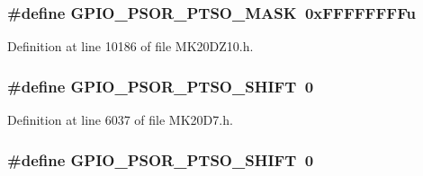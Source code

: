 \subsubsection[{\texorpdfstring{G\+P\+I\+O\+\_\+\+P\+S\+O\+R\+\_\+\+P\+T\+S\+O\+\_\+\+M\+A\+SK}{GPIO_PSOR_PTSO_MASK}}]{\setlength{\rightskip}{0pt plus 5cm}\#define G\+P\+I\+O\+\_\+\+P\+S\+O\+R\+\_\+\+P\+T\+S\+O\+\_\+\+M\+A\+SK~0x\+F\+F\+F\+F\+F\+F\+F\+Fu}\hypertarget{group___g_p_i_o___register___masks_gaa8a48e38ef70ff1ba3bbcbf31b891da4}{}\label{group___g_p_i_o___register___masks_gaa8a48e38ef70ff1ba3bbcbf31b891da4}


Definition at line 10186 of file M\+K20\+D\+Z10.\+h.

\subsubsection[{\texorpdfstring{G\+P\+I\+O\+\_\+\+P\+S\+O\+R\+\_\+\+P\+T\+S\+O\+\_\+\+S\+H\+I\+FT}{GPIO_PSOR_PTSO_SHIFT}}]{\setlength{\rightskip}{0pt plus 5cm}\#define G\+P\+I\+O\+\_\+\+P\+S\+O\+R\+\_\+\+P\+T\+S\+O\+\_\+\+S\+H\+I\+FT~0}\hypertarget{group___g_p_i_o___register___masks_ga5a962b85e07477e26afe639c7ca478cb}{}\label{group___g_p_i_o___register___masks_ga5a962b85e07477e26afe639c7ca478cb}


Definition at line 6037 of file M\+K20\+D7.\+h.

\subsubsection[{\texorpdfstring{G\+P\+I\+O\+\_\+\+P\+S\+O\+R\+\_\+\+P\+T\+S\+O\+\_\+\+S\+H\+I\+FT}{GPIO_PSOR_PTSO_SHIFT}}]{\setlength{\rightskip}{0pt plus 5cm}\#define G\+P\+I\+O\+\_\+\+P\+S\+O\+R\+\_\+\+P\+T\+S\+O\+\_\+\+S\+H\+I\+FT~0}\hypertarget{group___g_p_i_o___register___masks_ga5a962b85e07477e26afe639c7ca478cb}{}\label{group___g_p_i_o___register___masks_ga5a962b85e07477e26afe639c7ca478cb}


